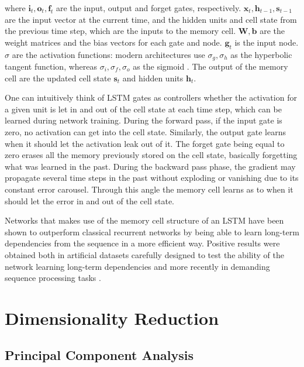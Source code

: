 \documentclass{kththesis}
\begin{document}
where $\mathbf{i}_t, \mathbf{o}_t, \mathbf{f}_t$ are the input, output and forget gates, respectively. $\mathbf{x}_t, \mathbf{h}_{t-1}, \mathbf{s}_{t-1}$ are the input vector at the current time, and the hidden units and cell state from the previous time step, which are the inputs to the memory cell. $\mathbf{W}, \mathbf{b}$ are the weight matrices and the bias vectors for each gate and node. $\mathbf{g}_t$ is the input node. $\sigma$ are the activation functions: modern architectures use $\sigma_g,\sigma_h$ as the hyperbolic tangent function, whereas $\sigma_i,\sigma_f,\sigma_o$ as the sigmoid \citep{zaremba2014learning}. The output of the memory cell are the updated cell state $\mathbf{s}_t$ and hidden units $\mathbf{h}_t$.

One can intuitively think of LSTM gates as controllers whether the activation for a given unit is let in and out of the cell state at each time step, which can be learned during network training. During the forward pass, if the input gate is zero, no activation can get into the cell state. Similarly, the output gate learns when it should let the activation leak out of it. The forget gate being equal to zero erases all the memory previously stored on the cell state, basically forgetting what was learned in the past. During the backward pass phase, the gradient may propagate several time steps in the past without exploding or vanishing due to its constant error carousel. Through this angle the memory cell learns as to when it should let the error in and out of the cell state.

Networks that makes use of the memory cell structure of an LSTM have been shown to outperform classical recurrent networks by being able to learn long-term dependencies from the sequence in a more efficient way. Positive results were obtained both in artificial datasets carefully designed to test the ability of the network learning long-term dependencies \citep{bengio1994learning} and more recently in demanding sequence processing tasks \citep{graves2013speech}\citep{sutskever2014sequence}.

\section{Dimensionality Reduction}

\subsection{Principal Component Analysis}
\end{document}
